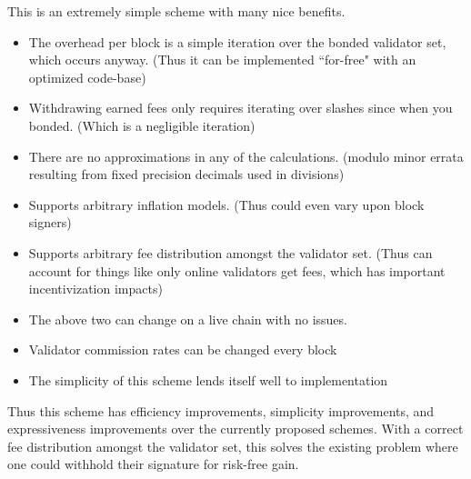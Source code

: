\documentclass[]{article}
\begin{document}
This is an extremely simple scheme with many nice benefits. 
\begin{itemize}
	\item The overhead per block is a simple iteration over the bonded validator set, which occurs anyway. (Thus it can be implemented ``for-free" with an optimized code-base)
	\item Withdrawing earned fees only requires iterating over slashes since when you bonded. (Which is a negligible iteration)
	\item There are no approximations in any of the calculations. (modulo minor errata resulting from fixed precision decimals used in divisions)
	\item Supports arbitrary inflation models. (Thus could even vary upon block signers)
	\item Supports arbitrary fee distribution amongst the validator set. (Thus can account for things like only online validators get fees, which has important incentivization impacts)
	\item The above two can change on a live chain with no issues.
	\item Validator commission rates can be changed every block
	\item The simplicity of this scheme lends itself well to implementation
\end{itemize}

Thus this scheme has efficiency improvements, simplicity improvements, and expressiveness improvements over the currently proposed schemes. With a correct fee distribution amongst the validator set, this solves the existing problem where one could withhold their signature for risk-free gain.
\end{document}
